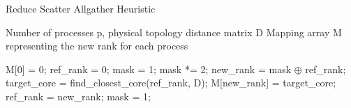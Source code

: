 \begin{algorithm}
  \caption{Reduce Scatter Allgather Heuristic}
  \label{alg:rsa}
  \begin{algorithmic}[1]
    \Require Number of processes p, physical topology distance matrix D
    \Ensure  Mapping array M representing the new rank for each process

    \State M[0] = 0;
    \State ref\_rank = 0;
    \State mask = 1;
        \State mask *= 2;
      \EndWhile
      \State new\_rank = mask $\oplus$ ref\_rank;
      \State target\_core = find\_closest\_core(ref\_rank, D);
      \State M[new\_rank] = target\_core;
        \State ref\_rank = new\_rank;
        \State mask = 1;
      \EndIf
      \EndWhile
  \end{algorithmic}
\end{algorithm}